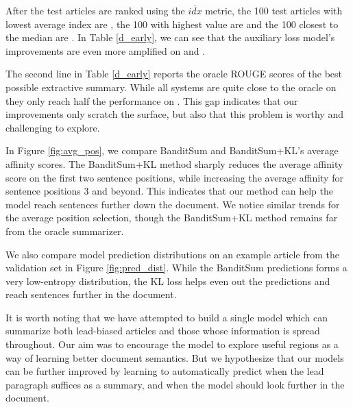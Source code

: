 After the test articles are ranked using the $\overline{idx}$ metric, the 100 test articles with lowest average index are \Dearly{}, the 100 with highest value are \Dlate{} and the 100 closest to the median are \Dmedian{}. In Table \ref{d_early}, we can see that the auxiliary loss model's improvements are even more amplified on \Dmedian{} and \Dlate{}. 

The second line in Table \ref{d_early} reports the oracle ROUGE scores of the best possible extractive summary. While all systems are quite close to the oracle on \Dearly{} they only reach half the performance on \Dlate{}. This gap indicates that our improvements only scratch the surface, but also that this problem is worthy and challenging to explore. 

In Figure \ref{fig:avg_pos}, we compare BanditSum and BanditSum+KL's average affinity scores. The BanditSum+KL method sharply reduces the average affinity score on the first two sentence positions, while increasing the average affinity for sentence positions 3 and beyond. This indicates that our method can help the model reach sentences further down the document. We notice similar trends for the average position selection, though the BanditSum+KL method remains far from the oracle summarizer.

We also compare model prediction distributions on an example article from the validation set in Figure \ref{fig:pred_dist}. While the BanditSum predictions forms a very low-entropy distribution, the KL loss helps even out the predictions and reach sentences further in the document.

It is worth noting that we have attempted to build a single model which can summarize both lead-biased articles and those whose information is spread throughout. Our aim was to encourage the model to explore useful regions as a way of learning better document semantics. But we hypothesize that our models can be further improved by learning to automatically predict when the lead paragraph suffices as a summary, and when the model should look further in the document.

